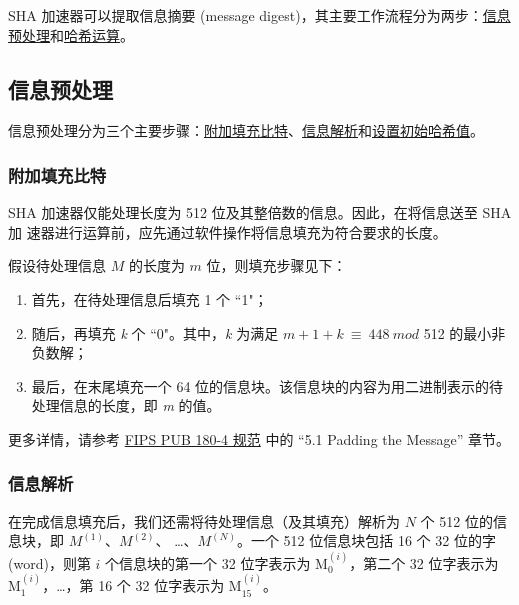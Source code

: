 \documentclass[main\_\_CN.tex]{subfiles}
\begin{document}
SHA 加速器可以提取信息摘要 (message digest)，其主要工作流程分为两步：\hyperref[sec:sha-preprocessing]{信息预处理}和\hyperref[sec:sha-hash-operation]{哈希运算}。

\subsection{信息预处理}\label{sec:sha-preprocessing}

信息预处理分为三个主要步骤：\hyperref[sec:sha-padding-msg]{附加填充比特}、\hyperref[sec:sha-parsing-msg]{信息解析}和\hyperref[sec:sha-set-initial-hash]{设置初始哈希值}。

\subsubsection{附加填充比特}\label{sec:sha-padding-msg}

SHA 加速器仅能处理长度为 512 位及其整倍数的信息。因此，在将信息送至 SHA 加
速器进行运算前，应先通过软件操作将信息填充为符合要求的长度。

假设待处理信息 \begin{math} M \end{math} 的长度为 \begin{math} m \end{math} 位，则填充步骤见下：

\begin{enumerate}
    \item 首先，在待处理信息后填充 1 个 ``1"；
    \item 随后，再填充 {\it{k}} 个 ``0"。其中，{\it{k}} 为满足 \begin{math}m + 1 + k \ {\equiv} \ 448 \ mod \end{math} 512 的最小非负数解；
    \item 最后，在末尾填充一个 64 位的信息块。该信息块的内容为用二进制表示的待处理信息的长度，即 {\it{m}} 的值。
\end{enumerate}

更多详情，请参考 \href{https://doi.org/10.6028/NIST.FIPS.180-4}{FIPS PUB 180-4 规范} 中的 “5.1 Padding the Message” 章节。

\subsubsection{信息解析}\label{sec:sha-parsing-msg}

在完成信息填充后，我们还需将待处理信息（及其填充）解析为 \begin{math}N\end{math} 个 512 位的信息块，即 \begin{math}M^{(1)}\end{math}、\begin{math}M^{(2)}\end{math}、 \dots、\begin{math}M^{(N)}\end{math}。一个 512 位信息块包括 16 个 32 位的字 (word)，则第 \begin{math}i\end{math} 个信息块的第一个 32 位字表示为 M$^{(i)}_{0}$，第二个 32 位字表示为 M$^{(i)}_{1}$，\dots，第 16 个 32 位字表示为 M$^{(i)}_{15}$。
\end{document}
